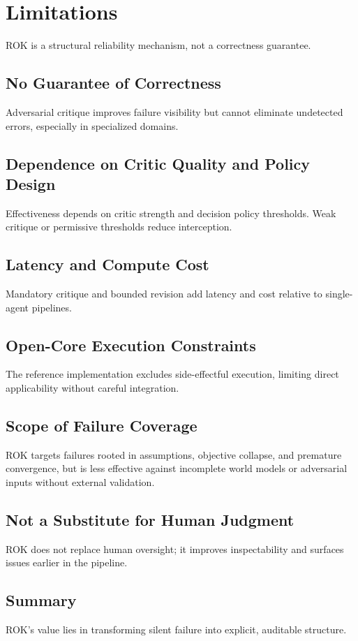 \section{Limitations}

ROK is a structural reliability mechanism, not a correctness guarantee.

\subsection{No Guarantee of Correctness}
Adversarial critique improves failure visibility but cannot eliminate undetected errors, especially in specialized domains.

\subsection{Dependence on Critic Quality and Policy Design}
Effectiveness depends on critic strength and decision policy thresholds. Weak critique or permissive thresholds reduce interception.

\subsection{Latency and Compute Cost}
Mandatory critique and bounded revision add latency and cost relative to single-agent pipelines.

\subsection{Open-Core Execution Constraints}
The reference implementation excludes side-effectful execution, limiting direct applicability without careful integration.

\subsection{Scope of Failure Coverage}
ROK targets failures rooted in assumptions, objective collapse, and premature convergence, but is less effective against incomplete world models or adversarial inputs without external validation.

\subsection{Not a Substitute for Human Judgment}
ROK does not replace human oversight; it improves inspectability and surfaces issues earlier in the pipeline.

\subsection{Summary}
ROK’s value lies in transforming silent failure into explicit, auditable structure.


